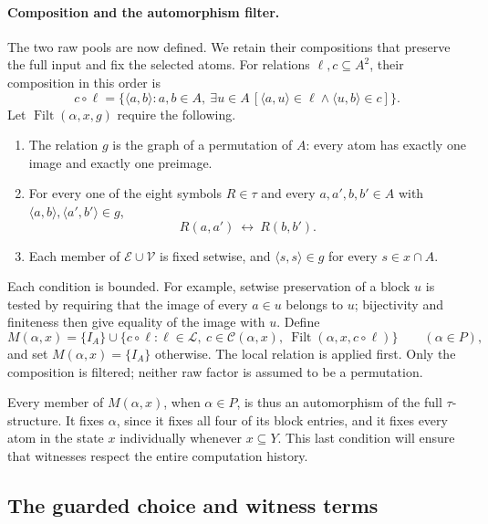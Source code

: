 \paragraph{Composition and the automorphism filter.}
The two raw pools are now defined. We retain their compositions that
preserve the full input and fix the selected atoms.
For relations \(\ell,c\subseteq A^2\), their composition in this order is
\[
 c\circ\ell
 =\{\langle a,b\rangle:a,b\in A,\
       \exists u\in A\,
       [\langle a,u\rangle\in\ell\land\langle u,b\rangle\in c]\}.
\]
Let \(\operatorname{Filt}(\alpha,x,g)\) require the following.
\begin{enumerate}[label=(\roman*)]
 \item The relation \(g\) is the graph of a permutation of \(A\):
       every atom has exactly one image and exactly one preimage.
 \item For every one of the eight symbols \(R\in\tau\) and every
       \(a,a',b,b'\in A\) with
       \(\langle a,b\rangle,\langle a',b'\rangle\in g\),
       \[
                     R(a,a')\ \longleftrightarrow\ R(b,b').
       \]
 \item Each member of \(\mathcal E\cup\mathcal V\) is fixed setwise,
       and \(\langle s,s\rangle\in g\) for every \(s\in x\cap A\).
\end{enumerate}
Each condition is bounded. For example, setwise preservation of a block
\(u\) is tested by requiring that the image of every \(a\in u\) belongs
to \(u\); bijectivity and finiteness then give equality of the image with
\(u\). Define
\begin{equation}
 M(\alpha,x)=
 \{I_A\}\cup
 \{c\circ\ell:\ell\in\mathcal L,\ c\in\mathcal C(\alpha,x),\
       \operatorname{Filt}(\alpha,x,c\circ\ell)\}
 \qquad(\alpha\in P),
 \label{sen:witness-pool}
\end{equation}
and set \(M(\alpha,x)=\{I_A\}\) otherwise.
The local relation is applied first. Only the composition is filtered;
neither raw factor is assumed to be a permutation.

Every member of \(M(\alpha,x)\), when \(\alpha\in P\), is thus an
automorphism of the full \(\tau\)-structure. It fixes \(\alpha\), since
it fixes all four of its block entries, and it fixes every atom in the
state \(x\) individually whenever \(x\subseteq Y\). This last condition
will ensure that witnesses respect the entire computation history.

\subsection{The guarded choice and witness terms}

